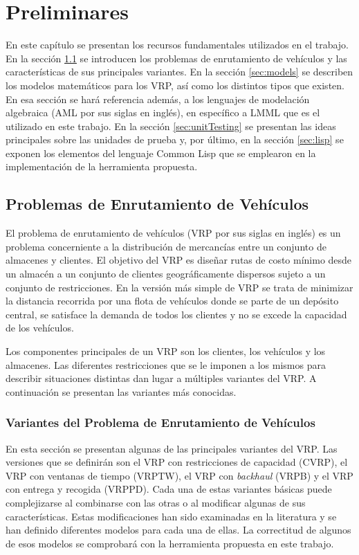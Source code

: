 \chapter{Preliminares}
\label{chap:preliminaries} %

En este capítulo se presentan los recursos fundamentales utilizados en el trabajo. En la sección \ref{sec:vrp} se introducen los problemas de enrutamiento de vehículos y las características de sus principales variantes. En la sección \ref{sec:models} se describen los modelos matemáticos para los VRP, así como los distintos tipos que existen. En esa sección se hará referencia además, a los lenguajes de modelación algebraica (AML por sus siglas en inglés), en específico a LMML que es el utilizado en este trabajo. En la sección \ref{sec:unitTesting} se presentan las ideas principales sobre las unidades de prueba y, por último, en la sección \ref{sec:lisp} se exponen los elementos del lenguaje Common Lisp que se emplearon en la implementación de la herramienta propuesta.

\section{Problemas de Enrutamiento de Vehículos}\label{sec:vrp}
El problema de enrutamiento de vehículos (VRP por sus siglas en inglés) es un problema concerniente a la distribución de mercancías entre un conjunto de almacenes y clientes. El objetivo del VRP es diseñar rutas de costo mínimo desde un almacén a un conjunto de clientes geográficamente dispersos sujeto a un conjunto de restricciones. En la versión más simple de VRP se trata de minimizar la distancia recorrida por una flota de vehículos donde se parte de un depósito central, se satisface la demanda de todos los clientes y no se excede la capacidad de los vehículos.

Los componentes principales de un VRP son los clientes, los vehículos y los almacenes. Las diferentes restricciones que se le imponen a los mismos para describir situaciones distintas dan lugar a múltiples variantes del VRP. A continuación se presentan las variantes más conocidas.

\subsection{Variantes del Problema de Enrutamiento de Vehículos}
\label{subsec:variants}

En esta sección se presentan algunas de las principales variantes del VRP. Las versiones que se definirán son el VRP con restricciones de capacidad (CVRP), el VRP con ventanas de tiempo (VRPTW), el VRP con {\it backhaul} (VRPB) y el VRP con entrega y recogida (VRPPD). Cada una de estas variantes básicas puede complejizarse al combinarse con las otras o al modificar algunas de sus características. Estas modificaciones han sido examinadas en la literatura \cite{toth@vrp} y se han definido diferentes modelos para cada una de ellas. La correctitud de algunos de esos modelos se comprobará con la herramienta propuesta en este trabajo.

